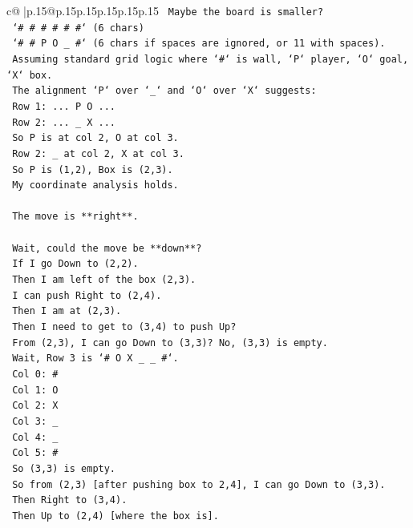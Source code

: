 \documentclass{article}
\begin{document}
{\begin{supertabular}{c@{$\;$}|p{.15\linewidth}@{}p{.15\linewidth}p{.15\linewidth}p{.15\linewidth}p{.15\linewidth}p{.15\linewidth}}
{{{\texttt{   Maybe the board is smaller?} \\
\texttt{   `\# \# \# \# \# \#` (6 chars)} \\
\texttt{   `\# \# P O \_ \#` (6 chars if spaces are ignored, or 11 with spaces).} \\
\texttt{   Assuming standard grid logic where `\#` is wall, `P` player, `O` goal, `X` box.} \\
\texttt{   The alignment `P` over `\_` and `O` over `X` suggests:} \\
\texttt{   Row 1: ... P O ...} \\
\texttt{   Row 2: ... \_ X ...} \\
\texttt{   So P is at col 2, O at col 3.} \\
\texttt{   Row 2: \_ at col 2, X at col 3.} \\
\texttt{   So P is (1,2), Box is (2,3).} \\
\texttt{   My coordinate analysis holds.} \\
\\ 
\texttt{   The move is **right**.} \\
\\ 
\texttt{   Wait, could the move be **down**?} \\
\texttt{   If I go Down to (2,2).} \\
\texttt{   Then I am left of the box (2,3).} \\
\texttt{   I can push Right to (2,4).} \\
\texttt{   Then I am at (2,3).} \\
\texttt{   Then I need to get to (3,4) to push Up?} \\
\texttt{   From (2,3), I can go Down to (3,3)? No, (3,3) is empty.} \\
\texttt{   Wait, Row 3 is `\# O X \_ \_ \#`.} \\
\texttt{   Col 0: \#} \\
\texttt{   Col 1: O} \\
\texttt{   Col 2: X} \\
\texttt{   Col 3: \_} \\
\texttt{   Col 4: \_} \\
\texttt{   Col 5: \#} \\
\texttt{   So (3,3) is empty.} \\
\texttt{   So from (2,3) {[}after pushing box to 2,4{]}, I can go Down to (3,3).} \\
\texttt{   Then Right to (3,4).} \\
\texttt{   Then Up to (2,4) {[}where the box is{]}.} \\
}}}
\end{supertabular}}
\end{document}
